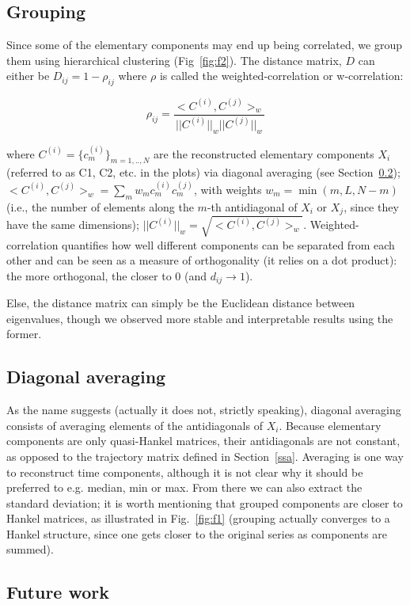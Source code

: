 \documentclass{article}
\begin{document}
\subsection{Grouping}
Since some of the elementary components may end up being correlated, we group them using hierarchical clustering (Fig~\ref{fig:f2}). The distance matrix, $D$ can either be $D_{ij}=1-\rho_{ij}$ where $\rho$ is called the weighted-correlation or w-correlation:

\begin{equation}
\rho_{ij} = \frac{<C^{(i)}, C^{(j)}>_w}{||C^{(i)}||_w ||C^{(j)}||_w} 
\end{equation}

where $C^{(i)}=\{c^{(i)}_m\}_{m=1,..,N}$ are the reconstructed elementary components $X_i$ (referred to as C1, C2, etc. in the plots) via diagonal averaging (see Section~\ref{da}); $<C^{(i)}, C^{(j)}>_w=\sum_m w_m c^{(i)}_m c^{(j)}_m$, with weights $w_m=\min(m, L, N-m)$ (i.e., the number of elements along the $m$-th antidiagonal of $X_i$ or $X_j$, since they have the same dimensions); $||C^{(i)}||_w=\sqrt{<C^{(i)}, C^{(j)}>_w}$. Weighted-correlation quantifies how well different components can be separated from each other and can be seen as a measure of orthogonality (it relies on a dot product): the more orthogonal, the closer to 0 (and $d_{ij}\rightarrow 1$).

Else, the distance matrix can simply be the Euclidean distance between eigenvalues, though we observed more stable and interpretable results using the former.


\subsection{Diagonal averaging}
\label{da}
As the name suggests (actually it does not, strictly speaking), diagonal averaging consists of averaging elements of the antidiagonals of $X_i$. Because elementary components are only quasi-Hankel matrices, their antidiagonals are not constant, as opposed to the trajectory matrix defined in Section~\ref{ssa}. Averaging is one way to reconstruct time components, although it is not clear why it should be preferred to e.g. median, min or max. From there we can also extract the standard deviation; it is worth mentioning that grouped components are closer to Hankel matrices, as illustrated in Fig.~\ref{fig:f1} (grouping actually converges to a Hankel structure, since one gets closer to the original series as components are summed).

\subsection{Future work}
\end{document}
